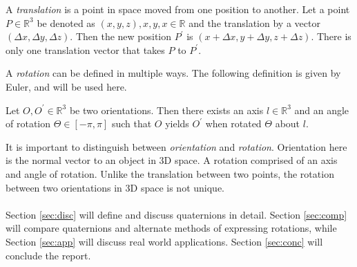 \begin{defn}[Translation]
A \textit{translation} is a point in space moved from one position to another.
Let a point $P \in \mathbb{R}^3$ be denoted as $(x,y,z), x,y,x \in \mathbb{R}$ and the translation by a vector $(\Delta x, \Delta y, \Delta z)$.
Then the new position $P^\prime$ is $(x + \Delta x, y + \Delta y, z + \Delta z)$.
There is only one translation vector that takes $P$ to $P^\prime$.
\end{defn}

\noindent A \textit{rotation} can be defined in multiple ways.
The following definition is given by Euler, and will be used here.

\begin{defn}
Let $O, O^\prime \in \mathbb{R}^3$ be two orientations.
Then there exists an axis $l \in \mathbb{R}^3$ and an angle of rotation $\Theta \in [-\pi, \pi]$ such that $O$ yields $O^\prime$ when rotated $\Theta$ about $l$.
\end{defn}

\noindent It is important to distinguish between \textit{orientation} and \textit{rotation}.
Orientation here is the normal vector to an object in 3D space.
A rotation comprised of an axis and angle of rotation.
Unlike the translation between two points, the rotation between two orientations in 3D space is not unique.
\\ \\
\noindent Section \ref{sec:disc} will define and discuss quaternions in detail.
Section \ref{sec:comp} will compare quaternions and alternate methods of expressing rotations, while Section \ref{sec:app} will discuss real world applications.
Section \ref{sec:conc} will conclude the report.
